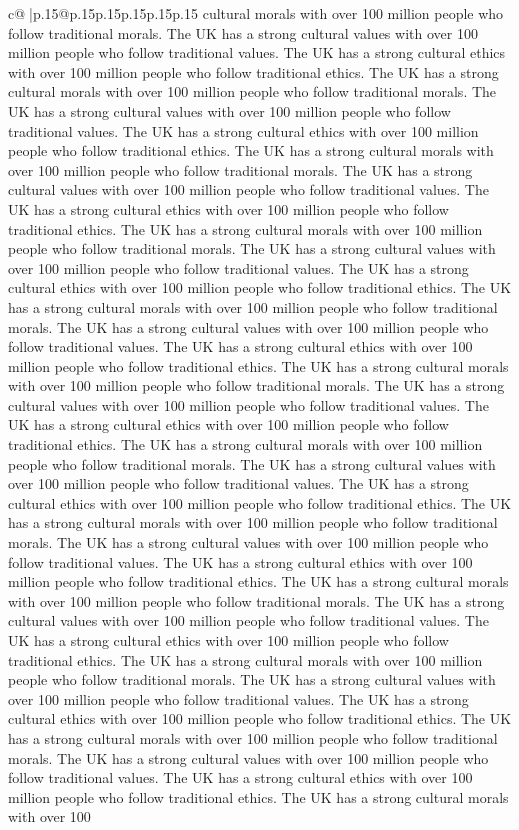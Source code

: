 \documentclass{article}
\begin{document}
{\begin{supertabular}{c@{$\;$}|p{.15\linewidth}@{}p{.15\linewidth}p{.15\linewidth}p{.15\linewidth}p{.15\linewidth}p{.15\linewidth}}
{{{cultural morals with over 100 million people who follow traditional morals. The UK has a strong cultural values with over 100 million people who follow traditional values. The UK has a strong cultural ethics with over 100 million people who follow traditional ethics. The UK has a strong cultural morals with over 100 million people who follow traditional morals. The UK has a strong cultural values with over 100 million people who follow traditional values. The UK has a strong cultural ethics with over 100 million people who follow traditional ethics. The UK has a strong cultural morals with over 100 million people who follow traditional morals. The UK has a strong cultural values with over 100 million people who follow traditional values. The UK has a strong cultural ethics with over 100 million people who follow traditional ethics. The UK has a strong cultural morals with over 100 million people who follow traditional morals. The UK has a strong cultural values with over 100 million people who follow traditional values. The UK has a strong cultural ethics with over 100 million people who follow traditional ethics. The UK has a strong cultural morals with over 100 million people who follow traditional morals. The UK has a strong cultural values with over 100 million people who follow traditional values. The UK has a strong cultural ethics with over 100 million people who follow traditional ethics. The UK has a strong cultural morals with over 100 million people who follow traditional morals. The UK has a strong cultural values with over 100 million people who follow traditional values. The UK has a strong cultural ethics with over 100 million people who follow traditional ethics. The UK has a strong cultural morals with over 100 million people who follow traditional morals. The UK has a strong cultural values with over 100 million people who follow traditional values. The UK has a strong cultural ethics with over 100 million people who follow traditional ethics. The UK has a strong cultural morals with over 100 million people who follow traditional morals. The UK has a strong cultural values with over 100 million people who follow traditional values. The UK has a strong cultural ethics with over 100 million people who follow traditional ethics. The UK has a strong cultural morals with over 100 million people who follow traditional morals. The UK has a strong cultural values with over 100 million people who follow traditional values. The UK has a strong cultural ethics with over 100 million people who follow traditional ethics. The UK has a strong cultural morals with over 100 million people who follow traditional morals. The UK has a strong cultural values with over 100 million people who follow traditional values. The UK has a strong cultural ethics with over 100 million people who follow traditional ethics. The UK has a strong cultural morals with over 100 million people who follow traditional morals. The UK has a strong cultural values with over 100 million people who follow traditional values. The UK has a strong cultural ethics with over 100 million people who follow traditional ethics. The UK has a strong cultural morals with over 100 }}}
\end{supertabular}}
\end{document}
